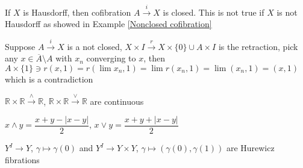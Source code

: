 \documentclass[main]{subfiles}
\begin{document}
\begin{exercise}\label{Cofibration in a Hausdorff space is closed}
If $X$ is Hausdorff, then cofibration $A\xrightarrow{i}X$ is closed. This is not true if $X$ is not Hausdorff as showed in Example \ref{Nonclosed cofibration}
\end{exercise}

\begin{solution}
Suppose $A\xrightarrow{i}X$ is a not closed, $X\times I\xrightarrow{r} X\times\{0\}\cup A\times I$ is the retraction, pick any $x\in\overline A\setminus A$ with $x_n$ converging to $x$, then $ A\times\{1\}\ni r(x,1)=r(\lim x_n,1)=\lim r(x_n,1)=\lim (x_n,1)=(x,1)$ which is a contradiction
\end{solution}

\begin{exercise}
$\mathbb R\times\mathbb R\xrightarrow\wedge\mathbb R$, $\mathbb R\times\mathbb R\xrightarrow\vee\mathbb R$ are continuous
\end{exercise}

\begin{solution}
$x\wedge y=\dfrac{x+y-|x-y|}{2}$, $x\vee y=\dfrac{x+y+|x-y|}{2}$
\end{solution}

\begin{exercise}
$Y^I\to Y$, $\gamma\mapsto\gamma(0)$ and $Y^I\to Y\times Y$, $\gamma\mapsto(\gamma(0),\gamma(1))$ are Hurewicz fibrations
\end{exercise}
\end{document}

